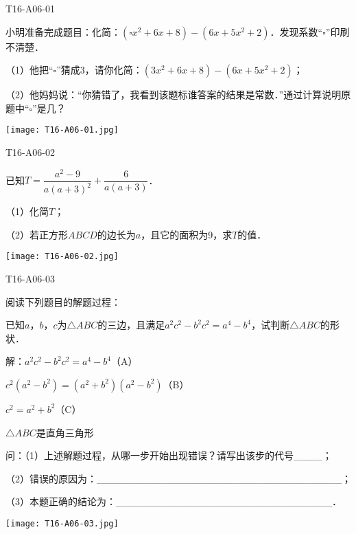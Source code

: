 
\begin{defproblem}{T16-A06-01}%
\begin{onlyproblem}%
小明准备完成题目：化简：$(\square x^2+6x+8)-(6x+5x^2+2)$．发现系数``$\square$''印刷不清楚．

（1）他把``$\square$''猜成3，请你化简：$(3x^2+6x+8)-(6x+5x^2+2)$；

（2）他妈妈说：``你猜错了，我看到该题标谁答案的结果是常数．''通过计算说明原题中``$\square$''是几？
\end{onlyproblem}%
\begin{onlysolution}%
\texttt{[image: T16-A06-01.jpg]}
\end{onlysolution}%
\end{defproblem}


\begin{defproblem}{T16-A06-02}%
\begin{onlyproblem}%
已知$T=\dfrac{a^2-9}{a(a+3)^2}+\dfrac{6}{a(a+3)}$．

（1）化简$T$；

（2）若正方形$ABCD$的边长为$a$，且它的面积为9，求$T$的值．
\end{onlyproblem}%
\begin{onlysolution}%
\texttt{[image: T16-A06-02.jpg]}
\end{onlysolution}%
\end{defproblem}


\begin{defproblem}{T16-A06-03}%
\begin{onlyproblem}%
阅读下列题目的解题过程：

已知$a$，$b$，$c$为$\triangle ABC$的三边，且满足$a^{2}c^{2}-b^{2}c^{2}=a^{4}-b^{4}$，试判断$\triangle ABC$的形状．

解：$a^{2}c^{2}-b^{2}c^{2}=a^{4}-b^{4}$（A）

$c^{2}(a^{2}-b^{2})=(a^{2}+b^{2})(a^{2}-b^{2})$（B）

$c^{2}=a^{2}+b^{2}$（C）

$\triangle ABC$是直角三角形

问：（1）上述解题过程，从哪一步开始出现错误？请写出该步的代号{\_}{\_}{\_}{\_}；

（2）错误的原因为：{\_}{\_}{\_}{\_}{\_}{\_}{\_}{\_}{\_}{\_}{\_}{\_}{\_}{\_}{\_}{\_}{\_}{\_}{\_}{\_}{\_}{\_}{\_}{\_}{\_}{\_}{\_}{\_}{\_}{\_}{\_}{\_}{\_}{\_}；

（3）本题正确的结论为：{\_}{\_}{\_}{\_}{\_}{\_}{\_}{\_}{\_}{\_}{\_}{\_}{\_}{\_}{\_}{\_}{\_}{\_}{\_}{\_}{\_}{\_}{\_}{\_}{\_}{\_}{\_}{\_}{\_}{\_}．
\end{onlyproblem}%
\begin{onlysolution}%
\texttt{[image: T16-A06-03.jpg]}
\end{onlysolution}%
\end{defproblem}


